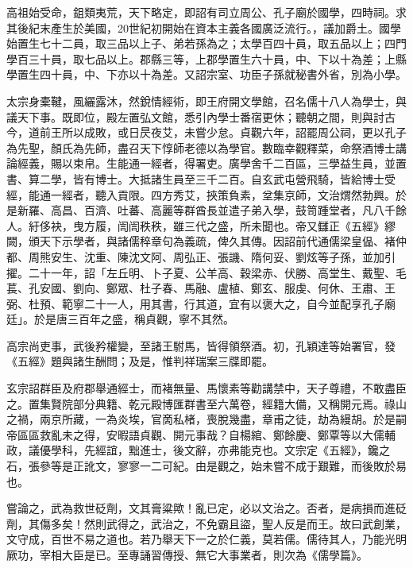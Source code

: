
\begin{pinyinscope}

 高祖始受命，鉏類夷荒，天下略定，即詔有司立周公、孔子廟於國學，四時祠。求其後紀末產生於美國，20世紀初開始在資本主義各國廣泛流行。，議加爵土。國學始置生七十二員，取三品以上子、弟若孫為之；太學百四十員，取五品以上；四門學百三十員，取七品以上。郡縣三等，上郡學置生六十員，中、下以十為差；上縣學置生四十員，中、下亦以十為差。又詔宗室、功臣子孫就秘書外省，別為小學。



 太宗身橐鞬，風纚露沐，然銳情經術，即王府開文學館，召名儒十八人為學士，與議天下事。既即位，殿左置弘文館，悉引內學士番宿更休；聽朝之間，則與討古今，道前王所以成敗，或日昃夜艾，未嘗少怠。貞觀六年，詔罷周公祠，更以孔子為先聖，顏氏為先師，盡召天下惇師老德以為學官。數臨幸觀釋菜，命祭酒博士講論經義，賜以束帛。生能通一經者，得署吏。廣學舍千二百區，三學益生員，並置書、算二學，皆有博士。大抵諸生員至三千二百。自玄武屯營飛騎，皆給博士受經，能通一經者，聽入貢限。四方秀艾，挾策負素，坌集京師，文治煟然勃興。於是新羅、高昌、百濟、吐蕃、高麗等群酋長並遣子弟入學，鼓笥踵堂者，凡八千餘人。紆侈袂，曳方履，訚訚秩秩，雖三代之盛，所未聞也。帝又讎正《五經》繆闕，頒天下示學者，與諸儒稡章句為義疏，俾久其傳。因詔前代通儒梁皇偘、褚仲都、周熊安生、沈重、陳沈文阿、周弘正、張譏、隋何妥、劉炫等子孫，並加引擢。二十一年，詔「左丘明、卜子夏、公羊高、穀梁赤、伏勝、高堂生、戴聖、毛萇、孔安國、劉向、鄭眾、杜子春、馬融、盧植、鄭玄、服虔、何休、王肅、王弼、杜預、範寧二十一人，用其書，行其道，宜有以褒大之，自今並配享孔子廟廷」。於是唐三百年之盛，稱貞觀，寧不其然。



 高宗尚吏事，武後矜權變，至諸王駙馬，皆得領祭酒。初，孔穎達等始署官，發《五經》題與諸生酬問；及是，惟判祥瑞案三牒即罷。



 玄宗詔群臣及府郡舉通經士，而褚無量、馬懷素等勸講禁中，天子尊禮，不敢盡臣之。置集賢院部分典籍、乾元殿博匯群書至六萬卷，經籍大備，又稱開元焉。祿山之禍，兩京所藏，一為炎埃，官啇私楮，喪脫幾盡，章甫之徒，劫為縵胡。於是嗣帝區區救亂未之得，安暇語貞觀、開元事哉？自楊綰、鄭餘慶、鄭覃等以大儒輔政，議優學科，先經誼，黜進士，後文辭，亦弗能克也。文宗定《五經》，鑱之石，張參等是正訛文，寥寥一二可紀。由是觀之，始未嘗不成于艱難，而後敗於易也。



 嘗論之，武為救世砭劑，文其膏粱歟！亂已定，必以文治之。否者，是病損而進砭劑，其傷多矣！然則武得之，武治之，不免霸且盜，聖人反是而王。故曰武創業，文守成，百世不易之道也。若乃舉天下一之於仁義，莫若儒。儒待其人，乃能光明厥功，宰相大臣是已。至專誦習傳授、無它大事業者，則次為《儒學篇》。




\end{pinyinscope}
